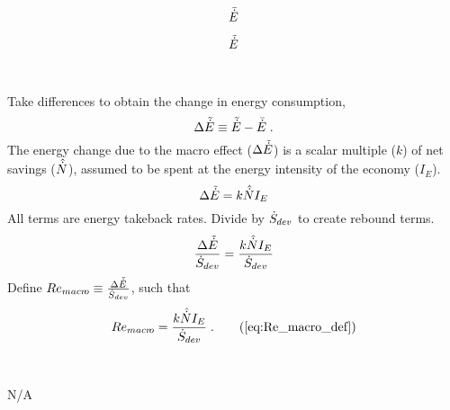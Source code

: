 

\begin{landscape}

\linespread{1}


\sectionsep{}

{
\begin{equation}
  \bar{\dot{E}}
\end{equation}
}
{
}

\sectionsep{}

{
\begin{equation}
\tilde{\dot{E}}
\end{equation}
}
{
}

\sectionsep{}

\derivsection{}
{
~

Take differences to obtain the change in energy consumption,
%
\begin{equation}
  \Delta \tilde{\dot{E}} \equiv \tilde{\dot{E}} - \bar{\dot{E}} \; .
\end{equation}
%
The energy change due to the macro effect ($\Delta \tilde{\dot{E}}$) 
is a scalar multiple ($k$) of net savings ($\hat{\dot{N}}$), 
assumed to be spent at the energy intensity of the economy ($I_E$).
%
\begin{equation}
  \Delta \tilde{\dot{E}} = k \hat{\dot{N}} I_E
\end{equation}
%
All terms are energy takeback rates.
Divide by $\dot{S}_{dev}$
to create rebound terms.
%
\begin{equation}
  \frac{\Delta \tilde{\dot{E}}}{\dot{S}_{dev}} = \frac{k \hat{\dot{N}} I_E}{\dot{S}_{dev}}
\end{equation}
%
Define 
$Re_{macr\!o} \equiv \frac{\Delta \tilde{\dot{E}}}{\dot{S}_{dev}}$, 
such that
%
\begin{equation}
  Re_{\macro} = \frac{k \rbinc{N} I_E}{\Sdot} \; . \tag{\ref{eq:Re_macro_def}}
\end{equation}
%
}
{
~
\centering

N/A
}
\end{landscape}
